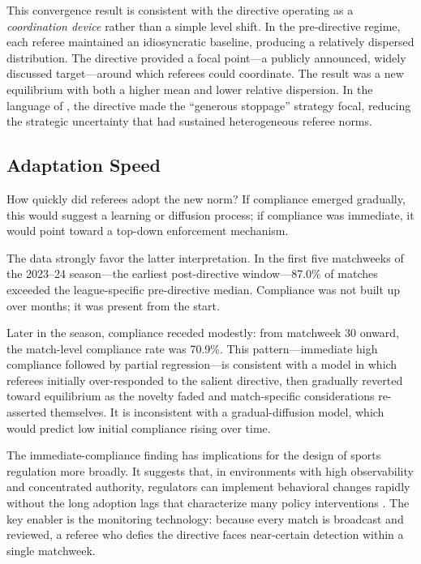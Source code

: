 This convergence result is consistent with the directive operating as a \emph{coordination device} rather than a simple level shift.  In the pre-directive regime, each referee maintained an idiosyncratic baseline, producing a relatively dispersed distribution.  The directive provided a focal point---a publicly announced, widely discussed target---around which referees could coordinate.  The result was a new equilibrium with both a higher mean and lower relative dispersion.  In the language of \citet{schelling1960}, the directive made the ``generous stoppage'' strategy focal, reducing the strategic uncertainty that had sustained heterogeneous referee norms.

\subsection{Adaptation Speed}
\label{sec:adaptation_speed}

How quickly did referees adopt the new norm?  If compliance emerged gradually, this would suggest a learning or diffusion process; if compliance was immediate, it would point toward a top-down enforcement mechanism.

The data strongly favor the latter interpretation.  In the first five matchweeks of the 2023--24 season---the earliest post-directive window---87.0\% of matches exceeded the league-specific pre-directive median.  Compliance was not built up over months; it was present from the start.

Later in the season, compliance receded modestly: from matchweek 30 onward, the match-level compliance rate was 70.9\%.  This pattern---immediate high compliance followed by partial regression---is consistent with a model in which referees initially over-responded to the salient directive, then gradually reverted toward equilibrium as the novelty faded and match-specific considerations re-asserted themselves.  It is inconsistent with a gradual-diffusion model, which would predict low initial compliance rising over time.

The immediate-compliance finding has implications for the design of sports regulation more broadly.  It suggests that, in environments with high observability and concentrated authority, regulators can implement behavioral changes rapidly without the long adoption lags that characterize many policy interventions \citep{rogers2003}.  The key enabler is the monitoring technology: because every match is broadcast and reviewed, a referee who defies the directive faces near-certain detection within a single matchweek.


